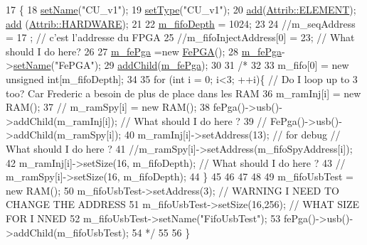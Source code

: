 \begin{DoxyCode}
17                \{
18   \hyperlink{classObject_ae30fea75683c2d149b6b6d17c09ecd0c}{setName}(\textcolor{stringliteral}{"CU\_v1"});
19   \hyperlink{classObject_aae534cc9d982bcb9b99fd505f2e103a5}{setType}(\textcolor{stringliteral}{"CU\_v1"});
20   \hyperlink{classAttrib_a235f773af19c900264a190b00a3b4ad7}{add}(\hyperlink{classAttrib_a69e171d7cc6417835a5a306d3c764235a7788bc5dd333fd8ce18562b269c9dab1}{Attrib::ELEMENT}); \hyperlink{classAttrib_a235f773af19c900264a190b00a3b4ad7}{add} (\hyperlink{classAttrib_a69e171d7cc6417835a5a306d3c764235a61ceb22149f365f1780d18f9d1459423}{Attrib::HARDWARE});  
21 
22   \hyperlink{classCU__v1_abc59a6644473bc4fdccc24e2a0c9d6ae}{m\_fifoDepth} = 1024;
23   
24   \textcolor{comment}{//m\_seqAddress   = 17 ;  // c'est l'addresse du FPGA }
25   \textcolor{comment}{//m\_fifoInjectAddress[0] = 23;  // What should I do here? }
26 
27   \hyperlink{classCU__v1_a1b96b95e89dbe383877b34f9b517d910}{m\_fePga} =\textcolor{keyword}{new} \hyperlink{classFePGA}{FePGA}();
28   \hyperlink{classCU__v1_a1b96b95e89dbe383877b34f9b517d910}{m\_fePga}->\hyperlink{classObject_ae30fea75683c2d149b6b6d17c09ecd0c}{setName}(\textcolor{stringliteral}{"FePGA"});
29   \hyperlink{classHierarchy_ad677774ff38fcb257c04a3a10d471fac}{addChild}(\hyperlink{classCU__v1_a1b96b95e89dbe383877b34f9b517d910}{m\_fePga});
30 
31   \textcolor{comment}{/*}
32 \textcolor{comment}{}
33 \textcolor{comment}{  m\_fifo[0] = new unsigned int[m\_fifoDepth];}
34 \textcolor{comment}{  }
35 \textcolor{comment}{  for (int i = 0; i<3; ++i)\{  // Do I loop up to 3 too? Car Frederic a besoin de plus de place dans les RAM}
36 \textcolor{comment}{    m\_ramInj[i] = new RAM();}
37 \textcolor{comment}{    //    m\_ramSpy[i] = new RAM();}
38 \textcolor{comment}{    fePga()->usb()->addChild(m\_ramInj[i]);  // What should I do here ? }
39 \textcolor{comment}{    //    FePga()->usb()->addChild(m\_ramSpy[i]);}
40 \textcolor{comment}{    m\_ramInj[i]->setAddress(13); // for debug   // What should I do here ? }
41 \textcolor{comment}{    //m\_ramSpy[i]->setAddress(m\_fifoSpyAddress[i]);}
42 \textcolor{comment}{    m\_ramInj[i]->setSize(16, m\_fifoDepth);   // What should I do here ? }
43 \textcolor{comment}{    // m\_ramSpy[i]->setSize(16, m\_fifoDepth);}
44 \textcolor{comment}{  \}}
45 \textcolor{comment}{}
46 \textcolor{comment}{}
47 \textcolor{comment}{}
48 \textcolor{comment}{  }
49 \textcolor{comment}{  m\_fifoUsbTest = new RAM();}
50 \textcolor{comment}{  m\_fifoUsbTest->setAddress(3); // WARNING I NEED TO CHANGE THE ADDRESS }
51 \textcolor{comment}{  m\_fifoUsbTest->setSize(16,256);  //  WHAT SIZE FOR I NNED }
52 \textcolor{comment}{  m\_fifoUsbTest->setName("FifoUsbTest");}
53 \textcolor{comment}{  fePga()->usb()->addChild(m\_fifoUsbTest);}
54 \textcolor{comment}{*/}  
55 
56 \}
\end{DoxyCode}
\mbox{\label{classCU__v1_a5755cbfa835ce6935169e3133a5bfedf}} 
